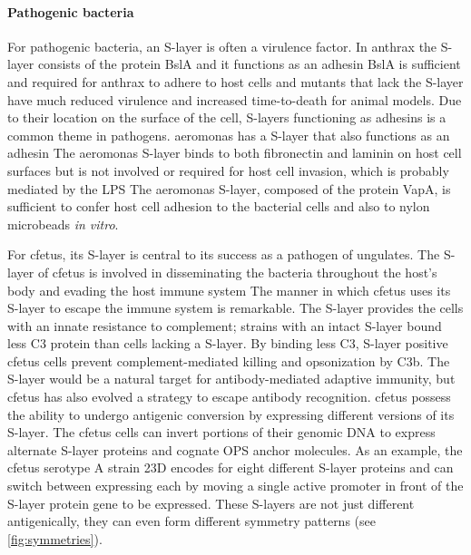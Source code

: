   \paragraph{Pathogenic bacteria} For pathogenic bacteria, an \ac{S-layer} is often a virulence factor. In \acl{anthrax} the \ac{S-layer} consists of the protein BslA and it
functions as an adhesin BslA is sufficient and required for \ac{anthrax} to adhere to host cells and mutants that lack the \ac{S-layer} have much reduced
virulence and increased time-to-death for animal models. Due to their location on the surface of the cell, \acp{S-layer} functioning as adhesins is a common theme in pathogens.
\ac{aeromonas} has a \ac{S-layer} that also functions as an adhesin The \ac{aeromonas} \ac{S-layer} binds to both fibronectin and laminin on host cell
surfaces but is not involved or required for host cell invasion, which is probably mediated by the \ac{LPS} The \ac{aeromonas}
\ac{S-layer}, composed of the protein VapA, is sufficient to confer host cell adhesion to the bacterial cells and also to nylon microbeads \textit{in vitro}.

  For \acl{cfetus}, its \ac{S-layer} is central to its success as a pathogen of ungulates. The \ac{S-layer} of \ac{cfetus} is involved in disseminating the bacteria throughout the
host's body and evading the host immune system The manner in which \ac{cfetus} uses its \ac{S-layer} to escape the immune system is remarkable.
The \ac{S-layer} provides the cells with an innate resistance to complement; strains with an intact \ac{S-layer} bound less C3 protein than cells lacking a \ac{S-layer}. By binding
less C3, \ac{S-layer} positive \ac{cfetus} cells prevent complement-mediated killing and opsonization by C3b. The \ac{S-layer} would be a natural target for antibody-mediated
adaptive immunity, but \ac{cfetus} has also evolved a strategy to escape antibody recognition. \ac{cfetus} possess the ability to undergo antigenic conversion by expressing
different versions of its \ac{S-layer}. The \ac{cfetus} cells can invert portions of their genomic DNA to express alternate \ac{S-layer} proteins and cognate \ac{OPS} anchor
molecules. As an example, the \ac{cfetus} serotype A strain 23D encodes for eight different \ac{S-layer} proteins and can switch between expressing each by moving a single active
promoter in front of the \ac{S-layer} protein gene to be expressed. These \acp{S-layer} are not just different antigenically, they can even form different symmetry patterns (see
\cref{fig:symmetries}).

